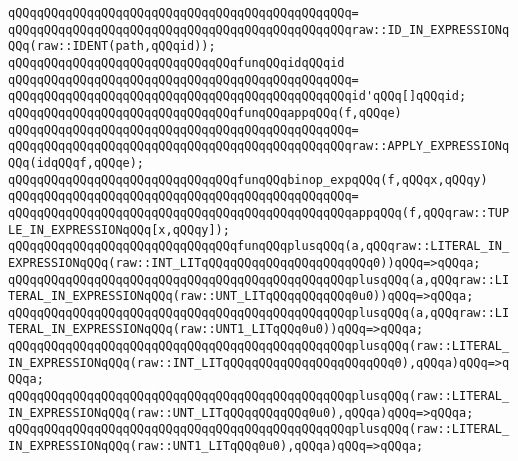 \verb|qQQqqQQqqQQqqQQqqQQqqQQqqQQqqQQqqQQqqQQqqQQqqQQq=|\newline
\verb|qQQqqQQqqQQqqQQqqQQqqQQqqQQqqQQqqQQqqQQqqQQqqQQqraw::ID_IN_EXPRESSIONqQQq(raw::IDENT(path,qQQqid));|\newline
\newline
\verb|qQQqqQQqqQQqqQQqqQQqqQQqqQQqqQQqfunqQQqidqQQqid|\newline
\verb|qQQqqQQqqQQqqQQqqQQqqQQqqQQqqQQqqQQqqQQqqQQqqQQq=|\newline
\verb|qQQqqQQqqQQqqQQqqQQqqQQqqQQqqQQqqQQqqQQqqQQqqQQqid'qQQq[]qQQqid;|\newline
\newline
\verb|qQQqqQQqqQQqqQQqqQQqqQQqqQQqqQQqfunqQQqappqQQq(f,qQQqe)|\newline
\verb|qQQqqQQqqQQqqQQqqQQqqQQqqQQqqQQqqQQqqQQqqQQqqQQq=|\newline
\verb|qQQqqQQqqQQqqQQqqQQqqQQqqQQqqQQqqQQqqQQqqQQqqQQqraw::APPLY_EXPRESSIONqQQq(idqQQqf,qQQqe);|\newline
\newline
\verb|qQQqqQQqqQQqqQQqqQQqqQQqqQQqqQQqfunqQQqbinop_expqQQq(f,qQQqx,qQQqy)|\newline
\verb|qQQqqQQqqQQqqQQqqQQqqQQqqQQqqQQqqQQqqQQqqQQqqQQq=|\newline
\verb|qQQqqQQqqQQqqQQqqQQqqQQqqQQqqQQqqQQqqQQqqQQqqQQqappqQQq(f,qQQqraw::TUPLE_IN_EXPRESSIONqQQq[x,qQQqy]);|\newline
\newline
\verb|qQQqqQQqqQQqqQQqqQQqqQQqqQQqqQQqfunqQQqplusqQQq(a,qQQqraw::LITERAL_IN_EXPRESSIONqQQq(raw::INT_LITqQQqqQQqqQQqqQQqqQQqqQQq0))qQQq=>qQQqa;|\newline
\verb|qQQqqQQqqQQqqQQqqQQqqQQqqQQqqQQqqQQqqQQqqQQqqQQqplusqQQq(a,qQQqraw::LITERAL_IN_EXPRESSIONqQQq(raw::UNT_LITqQQqqQQqqQQq0u0))qQQq=>qQQqa;|\newline
\verb|qQQqqQQqqQQqqQQqqQQqqQQqqQQqqQQqqQQqqQQqqQQqqQQqplusqQQq(a,qQQqraw::LITERAL_IN_EXPRESSIONqQQq(raw::UNT1_LITqQQq0u0))qQQq=>qQQqa;|\newline
\newline
\verb|qQQqqQQqqQQqqQQqqQQqqQQqqQQqqQQqqQQqqQQqqQQqqQQqplusqQQq(raw::LITERAL_IN_EXPRESSIONqQQq(raw::INT_LITqQQqqQQqqQQqqQQqqQQqqQQq0),qQQqa)qQQq=>qQQqa;|\newline
\verb|qQQqqQQqqQQqqQQqqQQqqQQqqQQqqQQqqQQqqQQqqQQqqQQqplusqQQq(raw::LITERAL_IN_EXPRESSIONqQQq(raw::UNT_LITqQQqqQQqqQQq0u0),qQQqa)qQQq=>qQQqa;|\newline
\verb|qQQqqQQqqQQqqQQqqQQqqQQqqQQqqQQqqQQqqQQqqQQqqQQqplusqQQq(raw::LITERAL_IN_EXPRESSIONqQQq(raw::UNT1_LITqQQq0u0),qQQqa)qQQq=>qQQqa;|\newline
